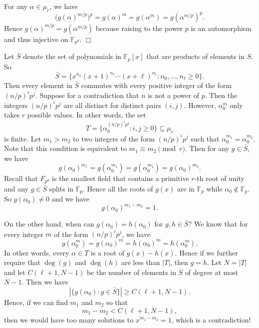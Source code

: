 \documentclass{article}
\def\F{{\mathbb F}}
\def\F{{\mathbb F}}
\newenvironment{proof}{\noindent {\bf Proof:}}{$\Box$ \vspace{2 ex}}
\begin{document}
\begin{proof}
    For any $\alpha\in\mu_r$, we have
    $$\big(g(\alpha)^{m/p}\big)^p = g(\alpha)^m =  g(\alpha^m) = g(\alpha^{m/p})^p.$$
    Hence $g(\alpha)^{m/p} = g(\alpha^{m/p})$ because raising to the power $p$ is an automorphism and thus injective on $\F_{p^d}.$
\end{proof}

Let $\bar{S}$ denote the set of polynomials in $\F_p[x]$ that are products of elements in $S$. So $$\bar{S} = \{x^{n_0}(x+1)^{n_1}\cdots(x+\ell)^{n_\ell}\colon n_0,\ldots,n_\ell\geq 0\}.$$ Then every element in $\bar{S}$ commutes with every positive integer of the form $(n/p)^i p^j$. Suppose for a contradiction that $n$ is not a power of $p$. Then the integers $(n/p)^ip^j$ are all distinct for distinct pairs $(i,j)$. However, $\alpha_0^m$ only takes $r$ possible values. In other words, the set
$$T = \{\alpha_0^{(n/p)^ip^j}\colon i,j\geq0\}\subseteq\mu_r$$
is finite. Let $m_1>m_2$ to two integers of the form $(n/p)^ip^j$ such that $\alpha_0^{m_1} = \alpha_0^{m_2}$. Note that this condition is equivalent to $m_1\equiv m_2\pmod{r}$. Then for any $g\in \bar{S}$, we have
$$g(\alpha_0)^{m_1} = g(\alpha_0^{m_1}) = g(\alpha_0^{m_2}) = g(\alpha_0)^{m_2}.$$
Recall that $F_{p^d}$ is the smallest field that contains a primitive $r$-th root of unity and any $g\in \bar{S}$ splits in $\F_p$. Hence all the roots of $g(x)$ are in $\F_p$ while $\alpha_0\notin\F_p$. So $g(\alpha_0)\neq 0$ and we have
$$g(\alpha_0)^{m_1-m_2} = 1.$$

On the other hand, when can $g(\alpha_0) = h(\alpha_0)$ for $g,h\in \bar{S}$? We know that for every integer $m$ of the form $(n/p)^ip^j$, we have
$$g(\alpha_0^m) = g(\alpha_0)^m = h(\alpha_0)^m = h(\alpha_0^m).$$
In other words, every $\alpha\in T$ is a root of $g(x) - h(x)$. Hence if we further require that $\deg(g)$ and $\deg(h)$ are less than $|T|$, then $g = h$. Let $N = |T|$ and let $C(\ell+1,N-1)$ be the number of elements in $\bar{S}$ of degree at most $N-1$. Then we have
$$|\{g(\alpha_0)\colon g\in\bar{S}\}| \geq C(\ell+1,N-1).$$
Hence, if we can find $m_1$ and $m_2$ so that $$m_1 - m_2 < C(\ell+1, N-1),$$ then we would have too many solutions to $x^{m_1-m_2} = 1$, which is a contradiction!
\end{document}
